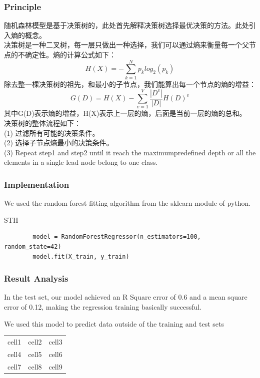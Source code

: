 \documentclass[a4paper]{article}
\begin{document}
\subsubsection{Principle}
随机森林模型是基于决策树的，此处首先解释决策树选择最优决策的方法。此处引入熵的概念。\\
决策树是一种二叉树，每一层只做出一种选择，我们可以通过熵来衡量每一个父节点的不确定性。熵的计算公式如下：\\
$$H(X)= -\sum_{k=1}^N p_k log_2(p_k)$$
除去整一棵决策树的祖先，和最小的子节点，我们能算出每一个节点的熵的增益：
$$G(D)= H(X)-\sum_{v=1}^V \frac {\left|D^v\right|}{\left|D\right|} H(D)^v$$
其中G(D)表示熵的增益，H(X)表示上一层的熵，后面是当前一层的熵的总和。\\
决策树的整体流程如下：\\
(1) 过滤所有可能的决策条件。\\
(2) 选择子节点熵最小的决策条件。\\
(3) Repeat step1 and step2 until it reach the maximumpredefined depth or all the elements in a single lead node belong to one class.\\
\subsubsection{Implementation}
We used the random forest fitting algorithm from the sklearn module of python.
\begin{listing}[htb]\caption{STH}\label{code:processdweet}
    \begin{verbatim}
        model = RandomForestRegressor(n_estimators=100, random_state=42)
        model.fit(X_train, y_train)
\end{verbatim} 
\end{listing}


\subsubsection{Result Analysis}
In the test set, our model achieved an R Square error of 0.6 and a mean square error of 0.12, making the regression training basically successful.

We used this model to predict data outside of the training and test sets

\begin{center}
    \begin{tabular}{ c c c }
     cell1 & cell2 & cell3 \\ 
     cell4 & cell5 & cell6 \\  
     cell7 & cell8 & cell9    
    \end{tabular}
    \end{center}
\end{document}
